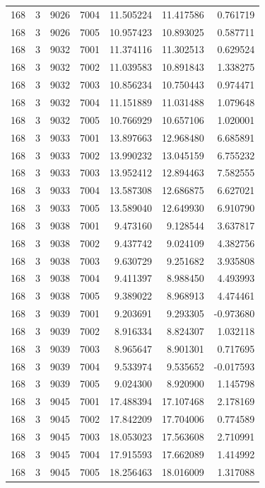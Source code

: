 \begin{table}
\begin{tabular}{rrrrrrr}
168 & 3 & 9026 & 7004 & 11.505224 & 11.417586 & 0.761719 \\
168 & 3 & 9026 & 7005 & 10.957423 & 10.893025 & 0.587711 \\
168 & 3 & 9032 & 7001 & 11.374116 & 11.302513 & 0.629524 \\
168 & 3 & 9032 & 7002 & 11.039583 & 10.891843 & 1.338275 \\
168 & 3 & 9032 & 7003 & 10.856234 & 10.750443 & 0.974471 \\
168 & 3 & 9032 & 7004 & 11.151889 & 11.031488 & 1.079648 \\
168 & 3 & 9032 & 7005 & 10.766929 & 10.657106 & 1.020001 \\
168 & 3 & 9033 & 7001 & 13.897663 & 12.968480 & 6.685891 \\
168 & 3 & 9033 & 7002 & 13.990232 & 13.045159 & 6.755232 \\
168 & 3 & 9033 & 7003 & 13.952412 & 12.894463 & 7.582555 \\
168 & 3 & 9033 & 7004 & 13.587308 & 12.686875 & 6.627021 \\
168 & 3 & 9033 & 7005 & 13.589040 & 12.649930 & 6.910790 \\
168 & 3 & 9038 & 7001 & 9.473160 & 9.128544 & 3.637817 \\
168 & 3 & 9038 & 7002 & 9.437742 & 9.024109 & 4.382756 \\
168 & 3 & 9038 & 7003 & 9.630729 & 9.251682 & 3.935808 \\
168 & 3 & 9038 & 7004 & 9.411397 & 8.988450 & 4.493993 \\
168 & 3 & 9038 & 7005 & 9.389022 & 8.968913 & 4.474461 \\
168 & 3 & 9039 & 7001 & 9.203691 & 9.293305 & -0.973680 \\
168 & 3 & 9039 & 7002 & 8.916334 & 8.824307 & 1.032118 \\
168 & 3 & 9039 & 7003 & 8.965647 & 8.901301 & 0.717695 \\
168 & 3 & 9039 & 7004 & 9.533974 & 9.535652 & -0.017593 \\
168 & 3 & 9039 & 7005 & 9.024300 & 8.920900 & 1.145798 \\
168 & 3 & 9045 & 7001 & 17.488394 & 17.107468 & 2.178169 \\
168 & 3 & 9045 & 7002 & 17.842209 & 17.704006 & 0.774589 \\
168 & 3 & 9045 & 7003 & 18.053023 & 17.563608 & 2.710991 \\
168 & 3 & 9045 & 7004 & 17.915593 & 17.662089 & 1.414992 \\
168 & 3 & 9045 & 7005 & 18.256463 & 18.016009 & 1.317088 \\

\end{tabular}
\end{table}
